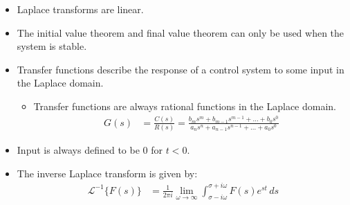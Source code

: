 \documentclass{article}
\begin{document}
\begin{itemize}
	\item Laplace transforms are linear.
	\item The initial value theorem and final value theorem can only be used when the system is stable.
	\item Transfer functions describe the response of a control system to some input in the Laplace domain.
	\begin{itemize}
		\item Transfer functions are always rational functions in the Laplace domain.
\begin{align*}
	G(s) &= \frac{C(s)}{R(s)} = \frac{b_m s^m + b_{m-1} s^{m-1} + \ldots + b_0 s^0}{a_n s^n + a_{n-1} s^{n-1} + \ldots + a_0 s^0}
\end{align*}

	\end{itemize}
	\item Input is always defined to be 0 for $t < 0$.
	\item The inverse Laplace transform is given by:
\begin{align*}
	\mathcal{L}^{-1}\{F(s)\} &= \frac{1}{2\pi i} \lim_{\omega \to \infty} \int_{\sigma - i\omega}^{\sigma + i\omega} F(s) e^{st} \, ds
\end{align*}
\end{itemize}

\ifdefined\iscombined
	\newpage
\else
	
\end{document}
